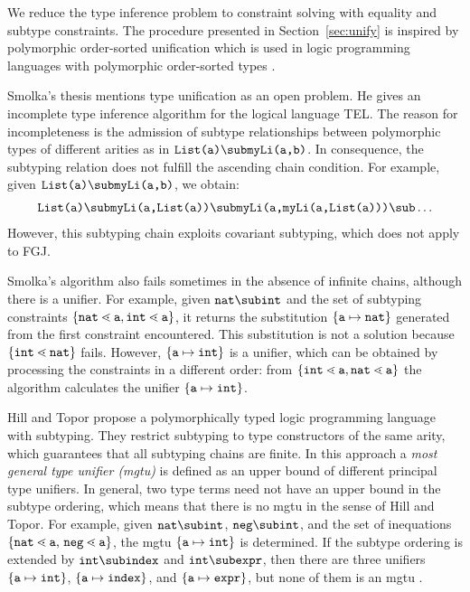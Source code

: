 We reduce the type inference problem to constraint solving with
equality and subtype constraints.
The procedure presented in Section~\ref{sec:unify} is inspired by
polymorphic order-sorted unification which is used in logic 
programming languages with polymorphic order-sorted types
\cite{GS89,MH91,HiTo92,CB95}.

Smolka's thesis \cite{GS89} mentions type unification
as an open problem. He gives  an incomplete type inference algorithm
for the logical language \textsf{TEL}. The reason for incompleteness
is the admission of subtype relationships between polymorphic types of
different arities as in  $\texttt{List(a)} \sub
\texttt{myLi(a,b)}$. In consequence, the subtyping relation does
not fulfill the ascending chain condition.
For example, given  $\texttt{List(a)} \sub \texttt{myLi(a,b)}$, we obtain:
\begin{gather*}
  \texttt{List(a)} \sub \texttt{myLi(a,List(a))} \sub \texttt{myLi(a,myLi(a,List(a)))}  \sub \dots
\end{gather*}
However, this subtyping chain exploits covariant subtyping, which does
not apply to FGJ.

Smolka's algorithm also fails sometimes in the absence of infinite
chains, although there is a unifier. 
For example, given $\texttt{nat} \sub \texttt{int}$ and the set
of subtyping constraints $\{ \mathtt{nat} \lessdot \mathtt{a},
  \mathtt{int} \lessdot \mathtt{a} \}$, it returns the substitution
$\{ \mathtt{a} \mapsto \mathtt{nat} \}$ generated from the first
constraint encountered. This substitution is not a solution
because $\{ \mathtt{int} \lessdot \mathtt{nat} \}$ fails.
However, $\{ \mathtt{a}\mapsto \mathtt{int} \}$ is a unifier, which
can be obtained by processing the constraints in a different order: from $\{ \mathtt{int} \lessdot \mathtt{a}, \mathtt{nat} \lessdot
  \mathtt{a} \}$ the algorithm calculates the unifier 
$\{ \mathtt{a}\mapsto \mathtt{int} \}$.

Hill and Topor  \cite{HiTo92} propose a polymorphically typed logic
programming language with subtyping. They restrict subtyping to type
constructors of the same arity,  which guarantees that all subtyping
chains are finite.
In this approach a \emph{most general type unifier (mgtu)} is
defined as an upper bound of different principal type unifiers. In
general, two type terms need not have an upper bound in the subtype ordering,
which means that there is no mgtu in the sense of Hill and Topor.
For example, given  $\texttt{nat} \sub \texttt{int}$, $\texttt{neg} 
\sub \texttt{int}$, and the set of inequations $\set{\mathtt{nat} \lessdot
  \mathtt{a}$, $\mathtt{neg} \lessdot \mathtt{a}}$, the mgtu $\{ \mathtt{a} \mapsto \texttt{int} \}$ is
determined. If the subtype ordering is extended by $\mathtt{int} \sub
\mathtt{index}$ and $\mathtt{int} \sub \mathtt{expr}$, then there are three
unifiers $\{ \mathtt{a} \mapsto \texttt{int} \}$, $\{ \mathtt{a} \mapsto
  \mathtt{index} \}$, and $\{ \mathtt{a} \mapsto 
\mathtt{expr} \}$, but none of them is an mgtu \cite{HiTo92}.

